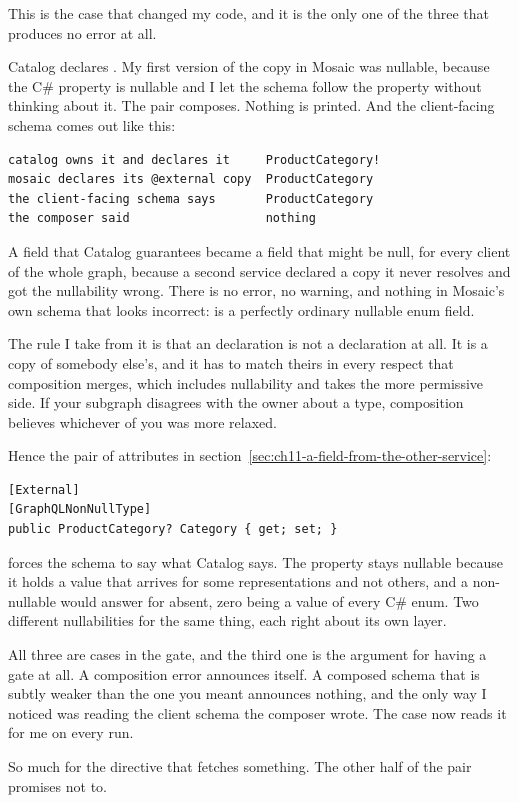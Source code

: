 %
This is the case that changed my code, and it is the only one of the three that
produces no error at all.

Catalog declares . My first version of the
 copy in Mosaic was nullable, because the C\# property is
nullable and I let the schema follow the property without thinking about it.
The pair composes. Nothing is printed. And the client-facing schema comes out
like this:

\begin{verbatim}
catalog owns it and declares it     ProductCategory!
mosaic declares its @external copy  ProductCategory
the client-facing schema says       ProductCategory
the composer said                   nothing
\end{verbatim}

A field that Catalog guarantees became a field that might be null, for every
client of the whole graph, because a second service declared a copy it never
resolves and got the nullability wrong. There is no error, no warning, and
nothing in Mosaic's own schema that looks incorrect:  is
a perfectly ordinary nullable enum field.

%
The rule I take from it is that an  declaration is not a
declaration at all. It is a copy of somebody else's, and it has to match theirs
in every respect that composition merges, which includes nullability and takes
the more permissive side. If your subgraph disagrees with the owner about a
type, composition believes whichever of you was more relaxed.

Hence the pair of attributes in
section~\ref{sec:ch11-a-field-from-the-other-service}:

\begin{verbatim}
[External]
[GraphQLNonNullType]
public ProductCategory? Category { get; set; }
\end{verbatim}

\code{[GraphQLNonNullType]} forces the schema to say what Catalog says. The
property stays nullable because it holds a value that arrives for some
representations and not others, and a non-nullable  would
answer  for absent, zero being a value of every C\# enum. Two
different nullabilities for the same thing, each right about its own layer.

%
All three are cases in the gate, and the third one is the argument for having a
gate at all. A composition error announces itself. A composed schema that is
subtly weaker than the one you meant announces nothing, and the only way I
noticed was reading the client schema the composer wrote. The case now reads it
for me on every run.

\medskip
So much for the directive that fetches something. The other half of the pair
promises not to.

%
